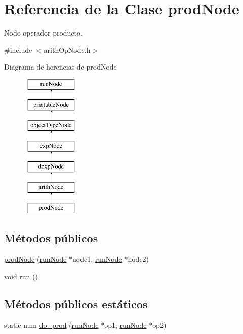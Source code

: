 \hypertarget{classprodNode}{\section{Referencia de la Clase prod\-Node}
\label{classprodNode}
}


Nodo operador producto.  




{\ttfamily \#include $<$arith\-Op\-Node.\-h$>$}

Diagrama de herencias de prod\-Node\begin{figure}[H]
\begin{center}
\leavevmode
\includegraphics[height=7.000000cm]{classprodNode}
\end{center}
\end{figure}
\subsection*{Métodos públicos}
\begin{DoxyCompactItemize}
\item 
\hyperlink{classprodNode_a5185691222c01674d44bab98e27b7158}{prod\-Node} (\hyperlink{classrunNode}{run\-Node} $\ast$node1, \hyperlink{classrunNode}{run\-Node} $\ast$node2)
\item 
void \hyperlink{classprodNode_aa632c55af2d26992b82b9f5a1ffed951}{run} ()
\end{DoxyCompactItemize}
\subsection*{Métodos públicos estáticos}
\begin{DoxyCompactItemize}
\item 
static num \hyperlink{classprodNode_a7caf19a0261725b8c393f23f3367f377}{do\-\_\-prod} (\hyperlink{classrunNode}{run\-Node} $\ast$op1, \hyperlink{classrunNode}{run\-Node} $\ast$op2)
\end{DoxyCompactItemize}
